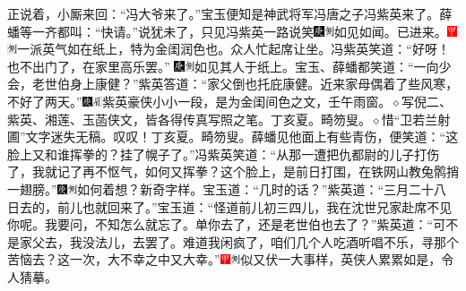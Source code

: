 正说着，小厮来回：“冯大爷来了。”宝玉便知是神武将军冯唐之子冯紫英来了。薛蟠等一齐都叫：“快请。”说犹未了，只见冯紫英一路说笑{\includegraphics[width=3mm]{../Images/00004}\includegraphics[width=3mm]{../Images/00011}\footnotesize \kaishu 如见如闻。}已进来。{\includegraphics[width=3mm]{../Images/00002}\includegraphics[width=3mm]{../Images/00011}\footnotesize \kaishu 一派英气如在纸上，特为金闺润色也。}众人忙起席让坐。冯紫英笑道：“好呀！也不出门了，在家里高乐罢。”
{\includegraphics[width=3mm]{../Images/00004}\includegraphics[width=3mm]{../Images/00011}\footnotesize \kaishu 如见其人于纸上。}宝玉、薛蟠都笑道：“一向少会，老世伯身上康健？”紫英答道：“家父倒也托庇康健。近来家母偶着了些风寒，不好了两天。”{{\includegraphics[width=3mm]{../Images/00004}\includegraphics[width=3mm]{../Images/00010}\footnotesize \kaishu 紫英豪侠小小一段，是为金闺间色之文，壬午雨窗。}{$\diamond$}写倪二、紫英、湘莲、玉菡侠文，皆各得传真写照之笔。丁亥夏。畸笏叟。{$\diamond$}惜“卫若兰射圃”文字迷失无稿。叹叹！丁亥夏。畸笏叟。}薛蟠见他面上有些青伤，便笑道：“这脸上又和谁挥拳的？挂了幌子了。”冯紫英笑道：“从那一遭把仇都尉的儿子打伤了，我就记了再不怄气，如何又挥拳？这个脸上，是前日打围，在铁网山教兔鹘捎一翅膀。”{\includegraphics[width=3mm]{../Images/00004}\includegraphics[width=3mm]{../Images/00011}\footnotesize \kaishu 如何着想？新奇字样。}宝玉道：“几时的话？”紫英道：“三月二十八日去的，前儿也就回来了。”宝玉道：“怪道前儿初三四儿，我在沈世兄家赴席不见你呢。我要问，不知怎么就忘了。单你去了，还是老世伯也去了？”紫英道：“可不是家父去，我没法儿，去罢了。难道我闲疯了，咱们几个人吃酒听唱不乐，寻那个苦恼去？这一次，大不幸之中又大幸。”{\includegraphics[width=3mm]{../Images/00002}\includegraphics[width=3mm]{../Images/00011}\footnotesize \kaishu 似又伏一大事样，英侠人累累如是，令人猜摹。}

